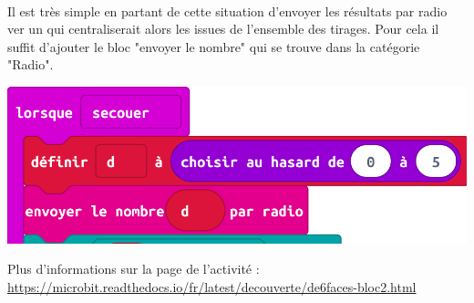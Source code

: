 \begin{minipage}[t]{0.5\linewidth}
    \begin{remarque}~\\
    Il est très simple en partant de cette situation d'envoyer les résultats par radio ver un \mb qui centraliserait alors les issues de l'ensemble des tirages. Pour cela il suffit d'ajouter le bloc "envoyer le nombre" qui se trouve dans la catégorie "Radio".
    
    \includegraphics[width=\linewidth]{res/mbDe6FacesN2radio.png}
    
    Plus d'informations sur la page de l'activité :\\ \url{https://microbit.readthedocs.io/fr/latest/decouverte/de6faces-bloc2.html}
    \end{remarque}
\end{minipage}